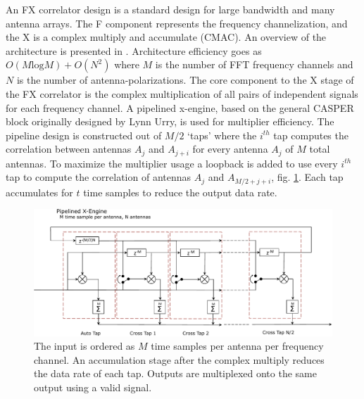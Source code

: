 \documentclass[useAMS,macros,usenatbib,onecolumn]{mn2e}
\begin{document}
An FX correlator design is a standard design for large bandwidth and many antenna arrays.
The F component represents the frequency channelization, and the X is a complex multiply and accumulate (CMAC).
An overview of the architecture is presented in \cite{romney_white_book}.
Architecture efficiency goes as $O( M \textrm{log} M) + O( N^2)$ where $M$ is the number of FFT frequency channels and $N$ is the number of antenna-polarizations.
The core component to the X stage of the FX correlator is the complex multiplication of all pairs of independent signals for each frequency channel.
A pipelined x-engine, based on the general CASPER block originally designed by Lynn Urry\citep{fxcorrelator}, is used for multiplier efficiency.
The pipeline design is constructed out of $M/2$ `taps' where the $i^{th}$ tap computes the correlation between antennas $A_j$ and $A_{j+i}$ for every antenna $A_j$ of $M$ total antennas.
To maximize the multiplier usage a loopback is added to use every $i^{th}$ tap to compute the correlation of antennas $A_j$ and $A_{M/2+j+i}$, fig. \ref{fig:xeng_pipe}.
Each tap accumulates for $t$ time samples to reduce the output data rate.

\begin{figure}
    \centering
    \includegraphics[scale=0.6]{graphics/crop_pipelined_xeng.pdf}
    \caption{The input is ordered as $M$ time samples per antenna per frequency channel. An accumulation stage after the complex multiply reduces the data rate of each tap. Outputs are multiplexed onto the same output using a valid signal.}
    \label{fig:xeng_pipe}
\end{figure}
\end{document}
